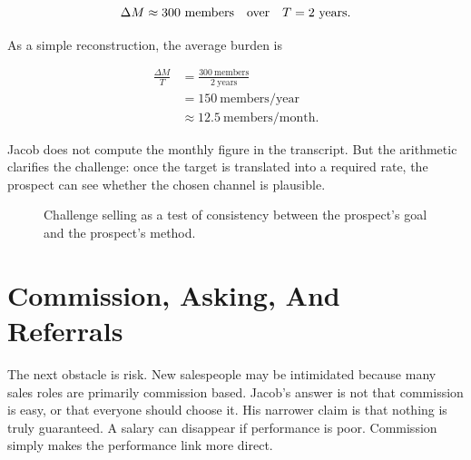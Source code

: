\begin{equation}
\Delta M \approx 300 \ \mathrm{members}
\quad \hbox{over} \quad
T = 2 \ \mathrm{years}.
\end{equation}

As a simple reconstruction, the average burden is

\begin{align}
\frac{\Delta M}{T}
&=
\frac{300 \ \mathrm{members}}{2 \ \mathrm{years}}  \\
&=
150 \ \mathrm{members/year} \\
&\approx
12.5 \ \mathrm{members/month}.
\end{align}

Jacob does not compute the monthly figure in the transcript. But the arithmetic clarifies the challenge: once the target is translated into a required rate, the prospect can see whether the chosen channel is plausible.

\begin{figure}
\centering
{}
\caption{Challenge selling as a test of consistency between the prospect's goal and the prospect's method.}
\end{figure}

\section{Commission, Asking, And Referrals}

The next obstacle is risk. New salespeople may be intimidated because many sales roles are primarily commission based. Jacob's answer is not that commission is easy, or that everyone should choose it. His narrower claim is that nothing is truly guaranteed. A salary can disappear if performance is poor. Commission simply makes the performance link more direct.

